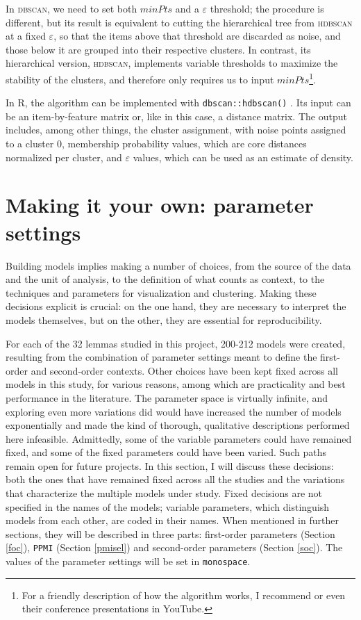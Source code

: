 \documentclass[
]{book}
\begin{document}
In \textsc{dbscan}, we need to set both \(minPts\) and a \(\varepsilon\) threshold; the procedure is different, but its result is equivalent to cutting the hierarchical tree from \textsc{hdbscan} at a fixed \(\varepsilon\), so that the items above that threshold are discarded as noise, and those below it are grouped into their respective clusters. In contrast, its hierarchical version, \textsc{hdbscan}, implements variable thresholds to maximize the stability of the clusters, and therefore only requires us to input \(minPts\)\footnote{For a friendly description of how the algorithm works, I recommend \textcite{mcinnes.etal_2016} or even their conference presentations in YouTube.}.

In R, the algorithm can be implemented with \texttt{dbscan::hdbscan()} \autocite{R-dbscan}. Its input can be an item-by-feature matrix or, like in this case, a distance matrix. The output includes, among other things, the cluster assignment, with noise points assigned to a cluster 0, membership probability values, which are core distances normalized per cluster, and \(\varepsilon\) values, which can be used as an estimate of density.

\hypertarget{params}{%
\section{Making it your own: parameter settings}\label{params}}

Building models implies making a number of choices, from the source of the data and the unit of analysis, to the definition of what counts as context, to the techniques and parameters for visualization and clustering. Making these decisions explicit is crucial: on the one hand, they are necessary to interpret the models themselves, but on the other, they are essential for reproducibility.

For each of the 32 lemmas studied in this project, 200-212 models were created, resulting from the combination of parameter settings meant to define the first-order and second-order contexts. Other choices have been kept fixed across all models in this study, for various reasons, among which are practicality and best performance in the literature. The parameter space is virtually infinite, and exploring even more variations did would have increased the number of models exponentially and made the kind of thorough, qualitative descriptions performed here infeasible. Admittedly, some of the variable parameters could have remained fixed, and some of the fixed parameters could have been varied. Such paths remain open for future projects.
In this section, I will discuss these decisions: both the ones that have remained fixed across all the studies and the variations that characterize the multiple models under study. Fixed decisions are not specified in the names of the models; variable parameters, which distinguish models from each other, are coded in their names. When mentioned in further sections, they will be described in three parts: first-order parameters (Section \ref{foc}), \texttt{PPMI} (Section \ref{pmisel}) and second-order parameters (Section \ref{soc}). The values of the parameter settings will be set in \texttt{monospace}.
\end{document}
